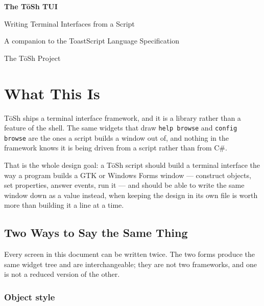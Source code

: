 \documentclass[11pt,a4paper,twoside,openany]{book}
\newcommand{\code}[1]{\texttt{\small #1}}
\begin{document}
\hypersetup{pageanchor=false}
\begin{titlepage}
\centering
\vspace*{5cm}
{\sffamily\Huge\bfseries\color{coverblue} The T\=oSh TUI\par}
\vspace{0.6cm}
{\sffamily\Large\color{covergold} Writing Terminal Interfaces from a Script\par}
\vspace{2.5cm}
{\sffamily\large A companion to the ToastScript Language Specification\par}
\vfill
{\sffamily\small The T\=oSh Project\par}
\end{titlepage}
\hypersetup{pageanchor=true}

\frontmatter
\tableofcontents

\mainmatter

\chapter{What This Is}

T\=oSh ships a terminal interface framework, and it is a library rather than a
feature of the shell. The same widgets that draw \code{help browse} and
\code{config browse} are the ones a script builds a window out of, and nothing in
the framework knows it is being driven from a script rather than from C\#.

That is the whole design goal: a T\=oSh script should build a terminal interface
the way a program builds a GTK or Windows Forms window --- construct objects, set
properties, answer events, run it --- and should be able to write the same window
down as a value instead, when keeping the design in its own file is worth more
than building it a line at a time.

\section{Two Ways to Say the Same Thing}

Every screen in this document can be written twice. The two forms produce the
same widget tree and are interchangeable; they are not two frameworks, and one is
not a reduced version of the other.

\subsection{Object style}
\end{document}
